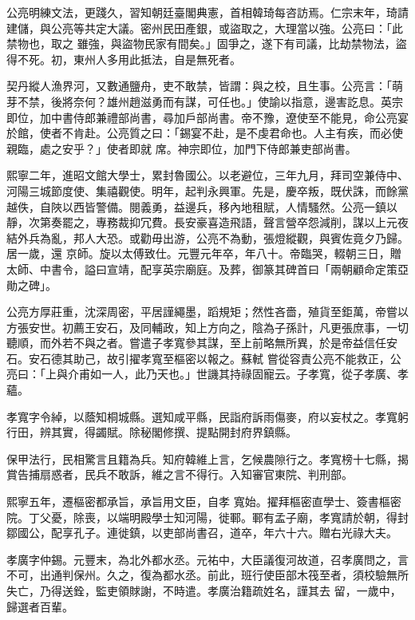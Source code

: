 \begin{pinyinscope}
 公亮明練文法，更踐久，習知朝廷臺閣典憲，首相韓琦每咨訪焉。仁宗末年，琦請建儲，與公亮等共定大議。密州民田產銀，或盜取之，大理當以強。公亮曰：「此禁物也，取之
 雖強，與盜物民家有間矣。」固爭之，遂下有司議，比劫禁物法，盜得不死。初，東州人多用此抵法，自是無死者。



 契丹縱人漁界河，又數通鹽舟，吏不敢禁，皆謂：與之校，且生事。公亮言：「萌芽不禁，後將奈何？雄州趙滋勇而有謀，可任也。」使諭以指意，邊害訖息。英宗即位，加中書侍郎兼禮部尚書，尋加戶部尚書。帝不豫，遼使至不能見，命公亮宴於館，使者不肯赴。公亮質之曰：「錫宴不赴，是不虔君命也。人主有疾，而必使親臨，處之安乎？」使者即就
 席。神宗即位，加門下侍郎兼吏部尚書。



 熙寧二年，進昭文館大學士，累封魯國公。以老避位，三年九月，拜司空兼侍中、河陽三城節度使、集禧觀使。明年，起判永興軍。先是，慶卒叛，既伏誅，而餘黨越佚，自陜以西皆警備。閱義勇，益邊兵，移內地租賦，人情騷然。公亮一鎮以靜，次第奏罷之，專務裁抑冗費。長安豪喜造飛語，聲言營卒怨減削，謀以上元夜結外兵為亂，邦人大恐。或勸毋出游，公亮不為動，張燈縱觀，與賓佐竟夕乃歸。居一歲，還
 京師。旋以太傅致仕。元豐元年卒，年八十。帝臨哭，輟朝三日，贈太師、中書令，謚曰宣靖，配享英宗廟庭。及葬，御篆其碑首曰「兩朝顧命定策亞勛之碑」。



 公亮方厚莊重，沈深周密，平居謹繩墨，蹈規矩；然性吝嗇，殖貨至鉅萬，帝嘗以方張安世。初薦王安石，及同輔政，知上方向之，陰為子孫計，凡更張庶事，一切聽順，而外若不與之者。嘗遣子孝寬參其謀，至上前略無所異，於是帝益信任安石。安石德其助己，故引擢孝寬至樞密以報之。蘇軾
 嘗從容責公亮不能救正，公亮曰：「上與介甫如一人，此乃天也。」世譏其持祿固寵云。子孝寬，從子孝廣、孝蘊。



 孝寬字令綽，以蔭知桐城縣。選知咸平縣，民詣府訴雨傷麥，府以妄杖之。孝寬躬行田，辨其實，得蠲賦。除秘閣修撰、提點開封府界鎮縣。



 保甲法行，民相驚言且籍為兵。知府韓維上言，乞候農隙行之。孝寬榜十七縣，揭賞告捕扇惑者，民兵不敢訴，維之言不得行。入知審官東院、判刑部。



 熙寧五年，遷樞密都承旨，承旨用文臣，自孝
 寬始。擢拜樞密直學士、簽書樞密院。丁父憂，除喪，以端明殿學士知河陽，徙鄆。鄆有孟子廟，孝寬請於朝，得封鄒國公，配享孔子。連徙鎮，以吏部尚書召，道卒，年六十六。贈右光祿大夫。



 孝廣字仲錫。元豐末，為北外都水丞。元祐中，大臣議復河故道，召孝廣問之，言不可，出通判保州。久之，復為都水丞。前此，班行使臣部木筏至者，須校驗無所失亡，乃得送銓，監吏領賕謝，不時遣。孝廣治籍疏姓名，謹其去
 留，一歲中，歸選者百輩。




\end{pinyinscope}
